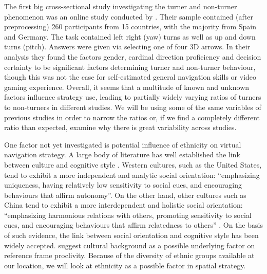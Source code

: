 \documentclass{frontiersSCNS} %
\begin{document}
The first big cross-sectional study investigating the turner and non-turner phenomenon was an online study conducted by \citep{Goeke2013}. Their sample contained (after preprocessing) 260 participants from 15 countries, with the majority from Spain and Germany. The task contained left right (yaw) turns as well as up and down turns (pitch). Answers were given via selecting one of four 3D arrows. In their analysis they found the factors gender, cardinal direction proficiency and decision certainty to be significant factors determining turner and non-turner behaviour, though this was not the case for self-estimated general navigation skills or video gaming experience. Overall, it seems that a multitude of known and unknown factors influence strategy use, leading to partially widely varying ratios of turners to non-turners in different studies. We will be using some of the same variables of previous studies in order to narrow the ratios or, if we find a completely different ratio than expected, examine why there is great variability across studies. 

One factor not yet investigated is potential influence of ethnicity on virtual navigation strategy. A large body of literature has well established the link between culture and cognitive style \citep{kitayama2010,kitayama2009,norenzayan2007,varnum2008}. Western cultures, such as the United States, tend to exhibit a more independent and analytic social orientation: “emphasizing uniqueness, having relatively low sensitivity to social cues, and encouraging behaviours that affirm autonomy”. On the other hand, other cultures such as China tend to exhibit a more interdependent and holistic social orientation: “emphasizing harmonious relations with others, promoting sensitivity to social cues, and encouraging behaviours that affirm relatedness to others” \citep{kitayama2010,varnum2010}. On the basis of such evidence, the link between social orientation and cognitive style has been widely accepted. \citep{Goeke2013} suggest cultural background as a possible underlying factor on reference frame proclivity. Because of the diversity of ethnic groups available at our location, we will look at ethnicity as a possible factor in spatial strategy.
\end{document}
